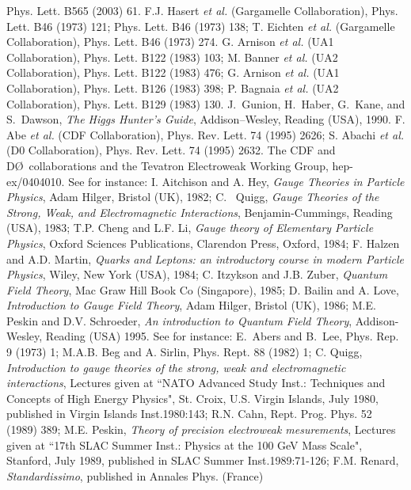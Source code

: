 \begin{thebibliography}{999}
Phys. Lett. B565 (2003) 61. 
%
 F.J. Hasert {\it et al.} (Gargamelle Collaboration),
Phys. Lett. B46 (1973) 121; \ib Phys. Lett. B46 (1973) 138; T. Eichten {\it et 
al.} (Gargamelle Collaboration), Phys. Lett. B46 (1973) 274.
%  
G. Arnison {\it et al.} (UA1 Collaboration), Phys. Lett. B122 (1983) 103; 
M. Banner  {\it et al.} (UA2 Collaboration), Phys. Lett. B122 (1983) 476; 
G. Arnison {\it et al.} (UA1 Collaboration), Phys. Lett. B126 (1983) 398;
P. Bagnaia {\it et al.} (UA2 Collaboration), Phys. Lett. B129 (1983) 130. 
%
 J.~Gunion, H.~Haber, G.~Kane, and S.~Dawson, {\it The Higgs 
Hunter's Guide}, Addison--Wesley, Reading (USA), 1990. 
%
 F. Abe {\it et al.} (CDF Collaboration), Phys. Rev. 
Lett. 74 (1995) 2626; S. Abachi {\it et al.} (D0 Collaboration), Phys. Rev. 
Lett. 74 (1995) 2632.  
%
 The CDF and D\O\ collaborations and the Tevatron 
Electroweak Working Group, hep-ex/0404010.
%
 See for instance:  
I. Aitchison and A. Hey, {\it Gauge Theories in Particle Physics}, 
Adam Hilger, Bristol (UK), 1982;  
C. ~Quigg, {\it Gauge Theories of the Strong, Weak, and Electromagnetic 
Interactions}, Benjamin-Cummings, Reading (USA),  1983; 
T.P. Cheng and L.F. Li, {\it Gauge theory of Elementary Particle Physics}, 
Oxford Sciences Publications, Clarendon Press, Oxford, 1984; 
F. Halzen and A.D. Martin, {\it Quarks and Leptons: an introductory course in 
modern Particle Physics}, Wiley, New York (USA), 1984; 
C. Itzykson and J.B. Zuber, {\it Quantum Field Theory}, Mac Graw Hill Book Co
(Singapore), 1985; 
D. Bailin and A. Love, {\it Introduction to Gauge Field Theory},  
Adam Hilger, Bristol (UK), 1986;
M.E. Peskin and D.V. Schroeder, {\it An introduction to Quantum Field
Theory}, Addison-Wesley, Reading (USA) 1995. 
%
 See for instance:  
E.~Abers and B.~Lee, Phys. Rep. 9 (1973) 1;
M.A.B. Beg and A. Sirlin, Phys. Rept. 88 (1982) 1; 
C.  Quigg, {\it Introduction to gauge theories of the strong, weak and
electromagnetic interactions}, Lectures given at ``NATO Advanced Study Inst.:  
Techniques and Concepts of High Energy Physics", St. Croix, U.S. Virgin 
Islands, July 1980, published in Virgin Islands Inst.1980:143;
%
R.N. Cahn, Rept. Prog. Phys. 52 (1989) 389;
%
M.E. Peskin, {\it Theory of precision electroweak mesurements}, Lectures given 
at ``17th SLAC Summer Inst.: Physics at the 100 GeV Mass Scale", Stanford, July 
1989, published in SLAC Summer Inst.1989:71-126; 
%
F.M. Renard, {\it Standardissimo}, published in Annales Phys. (France) 

\end{thebibliography}

